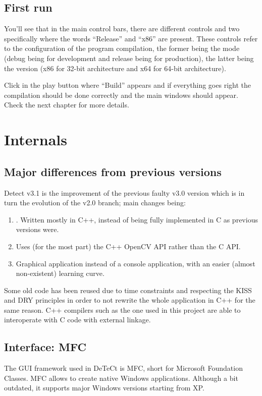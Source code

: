 \documentclass[a4paper,11pt]{memoir}
\begin{document}
\section{First run}
You’ll see that in the main control bars, there are different controls and two specifically where the words “Release” and “x86” are present. These controls refer to the configuration of the program compilation, the former being the mode (debug being for development and release being for production), the latter being the version (x86 for 32-bit architecture and x64 for 64-bit architecture).

Click in the play button where “Build” appears and if everything goes right the compilation should be done correctly and the main windows should appear. Check the next chapter for more details.


\chapter{Internals}

\section{Major differences from previous versions}

Detect v3.1 is the improvement of the previous faulty v3.0 version which is in turn the evolution of the v2.0 branch; main changes being:

\begin{enumerate}
\item. Written mostly in C++, instead of being fully implemented in C as previous versions were.
\item Uses (for the most part) the C++ OpenCV API rather than the C API.
\item Graphical application instead of a console application, with an easier (almost non-existent) learning curve.
\end{enumerate}

Some old code has been reused due to time constraints and respecting the KISS and DRY principles in order to not rewrite the whole application in C++ for the same reason. C++ compilers such as the one used in this project are able to interoperate with C code with external linkage.


\section{Interface: MFC}
The GUI framework used in DeTeCt is MFC, short for Microsoft Foundation Classes. MFC allows to create native Windows applications. Although a bit outdated, it supports major Windows versions starting from XP.
\end{document}
